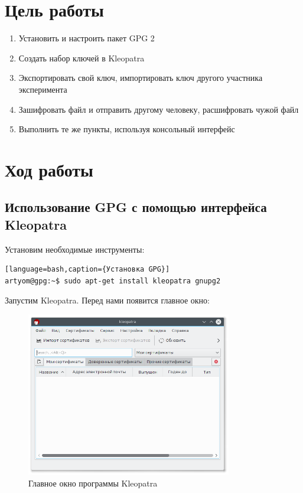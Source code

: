 \section{Цель работы}

\begin{enumerate}
	\item Установить и настроить пакет GPG 2
	\item Создать набор ключей в Kleopatra
	\item Экспортировать свой ключ, импортировать ключ другого участника эксперимента
	\item Зашифровать файл и отправить другому человеку, расшифровать чужой файл
	\item Выполнить те же пункты, используя консольный интерфейс
\end{enumerate}

\section{Ход работы}

\subsection{Использование GPG с помощью интерфейса Kleopatra}

Установим необходимые инструменты:

\begin{verbatim}[language=bash,caption={Установка GPG}]
artyom@gpg:~$ sudo apt-get install kleopatra gnupg2
\end{verbatim}

Запустим Kleopatra. Перед нами появится главное окно:

\begin{figure}[H]
	\centering
	\includegraphics[width=0.8\textwidth]{figures/screen1.png}
	\caption{Главное окно программы Kleopatra}
\end{figure}

